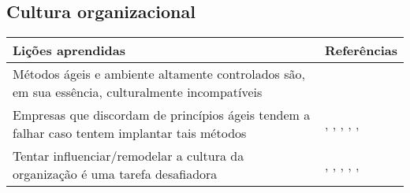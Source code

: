 \subsection{Cultura organizacional}

\begin{table}[H]
	\centering
	\begin{tabularx}{\linewidth}{ | X | p{5cm} | } \hline \textbf{Lições aprendidas} & \textbf{Referências} \\ \hline
		Métodos ágeis e ambiente altamente controlados são, em sua essência, culturalmente incompatíveis & \cite{Fitzgerald2013} \\ \hline
		Empresas que discordam de princípios ágeis tendem a falhar caso tentem implantar tais métodos & \cite{Bustard2013}, \cite{Microsoft2013}, \cite{Claudia2013}, \cite{Nokia2013}, \cite{Sahota2012}, \cite{Maciel2013} \\ \hline
		Tentar influenciar/remodelar a cultura da organização é uma tarefa desafiadora & \cite{Eunha2012}, \cite{Rodrigues2013}, \cite{Bastos2013}, \cite{Sahota2012}, \cite{Srinath2012}, \cite{Maciel2013} \\ \hline
	\end{tabularx}
\end{table}

